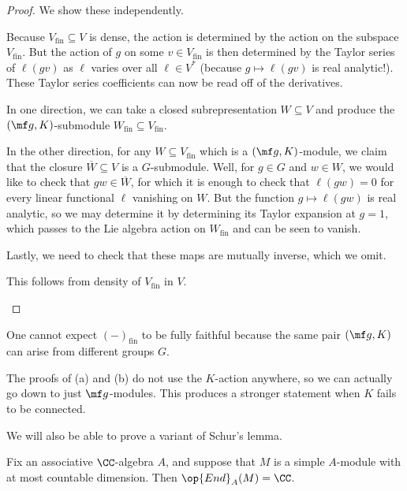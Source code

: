 \documentclass[../notes.tex]{subfiles}
\begin{document}
\begin{proof}
	We show these independently.
	\begin{listalph}
		\item Because $V_{\mathrm{fin}}\subseteq V$ is dense, the action is determined by the action on the subspace $V_{\mathrm{fin}}$. But the action of $g$ on some $v\in V_{\mathrm{fin}}$ is then determined by the Taylor series of $\ell(gv)$ as $\ell$ varies over all $\ell\in V^*$ (because $g\mapsto\ell(gv)$ is real analytic!). These Taylor series coefficients can now be read off of the derivatives.

		\item In one direction, we can take a closed subrepresentation $W\subseteq V$ and produce the $(\mf g,K)$-submodule $W_{\mathrm{fin}}\subseteq V_{\mathrm{fin}}$.
		
		In the other direction, for any $W\subseteq V_{\mathrm{fin}}$ which is a $(\mf g,K)$-module, we claim that the closure $\overline W\subseteq V$ is a $G$-submodule. Well, for $g\in G$ and $w\in W$, we would like to check that $gw\in\overline W$, for which it is enough to check that $\ell(gw)=0$ for every linear functional $\ell$ vanishing on $W$. But the function $g\mapsto\ell(gw)$ is real analytic, so we may determine it by determining its Taylor expansion at $g=1$, which passes to the Lie algebra action on $W_{\mathrm{fin}}$ and can be seen to vanish.

		Lastly, we need to check that these maps are mutually inverse, which we omit.

		\item This follows from density of $V_{\mathrm{fin}}$ in $V$.
		\qedhere
	\end{listalph}
\end{proof}
\begin{remark}
	One cannot expect $(-)_{\mathrm{fin}}$ to be fully faithful because the same pair $(\mf g,K)$ can arise from different groups $G$.
\end{remark}
\begin{remark}
	The proofs of (a) and (b) do not use the $K$-action anywhere, so we can actually go down to just $\mf g$-modules. This produces a stronger statement when $K$ fails to be connected.
\end{remark}
We will also be able to prove a variant of Schur's lemma.
\begin{lemma}[Dixmier] \label{lem:dixmier}
	Fix an associative $\CC$-algebra $A$, and suppose that $M$ is a simple $A$-module with at most countable dimension. Then $\op{End}_A(M)=\CC$.
\end{lemma}
\end{document}
